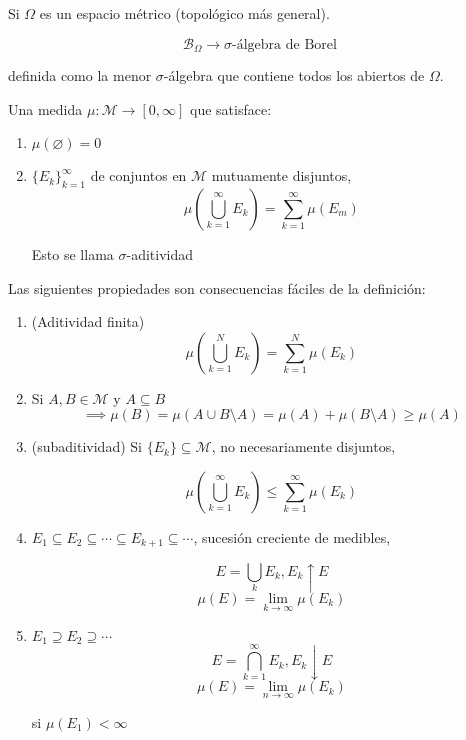 \begin{fexample}
    Si $\Omega$ es un espacio métrico (topológico más general).

    \[\mathcal{B}_\Omega\to \sigma\text{-álgebra de Borel}\]

    definida como la menor $\sigma$-álgebra que contiene todos los abiertos de $\Omega$.
\end{fexample}

\begin{fdefinition}
    Una medida $\mu:\mathcal{M}\to[0,\infty]$ que satisface:

    \begin{enumerate}
        \item $\mu(\varnothing)=0$
        \item $\{E_k\}_{k=1}^\infty$ de conjuntos en $\mathcal{M}$ mutuamente disjuntos, 
        \[\mu\left(\bigcup_{k=1}^\infty E_k\right)=\sum_{k=1}^\infty \mu(E_m)\]

        Esto se llama $\sigma$-aditividad
    \end{enumerate}
\end{fdefinition}

Las siguientes propiedades son consecuencias fáciles de la definición:

\begin{enumerate}
    \item (Aditividad finita) 
    \[\mu\left(\bigcup_{k=1}^N E_k\right)=\sum_{k=1}^N \mu(E_k)\]

    \item Si $A,B\in\mathcal{M}$ y $A\subseteq B$ 
    \[\implies \mu(B)=\mu(A\cup B\setminus A)=\mu(A)+\mu(B\setminus A)\geq \mu(A)\]

    \item (subaditividad) Si $\{E_k\}\subseteq \mathcal{M}$, no necesariamente disjuntos,
    
    \[\mu\left(\bigcup_{k=1}^\infty E_k\right)\leq \sum_{k=1}^\infty \mu(E_k)\]

    \item $E_1\subseteq E_2\subseteq \cdots\subseteq E_{k+1}\subseteq \cdots$, sucesión creciente de medibles, 
    
    \[E=\bigcup_k E_k, E_k\uparrow E\]
    \[\mu(E)=\lim_{k\to\infty} \mu(E_k)\]

    \item $E_1\supseteq E_2\supseteq \cdots$
    \[E=\bigcap_{k=1}^\infty E_k, E_k\downarrow E\]
    \[\mu(E)=\lim_{n\to\infty} \mu(E_k)\]

    si $\mu(E_1)<\infty$
\end{enumerate}

